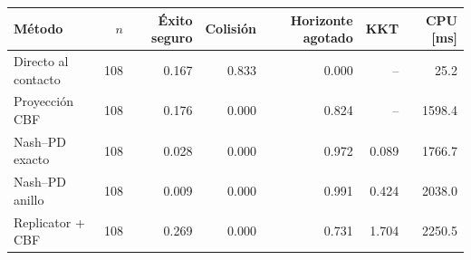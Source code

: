 \begin{tabular}{lrrrrrr}
\toprule
M\'etodo & $n$ & \'Exito seguro & Colisi\'on & Horizonte agotado & KKT & CPU [ms] \\
\midrule
Directo al contacto & 108 & 0.167 & 0.833 & 0.000 & -- & 25.2 \\
Proyecci\'on CBF & 108 & 0.176 & 0.000 & 0.824 & -- & 1598.4 \\
Nash--PD exacto & 108 & 0.028 & 0.000 & 0.972 & 0.089 & 1766.7 \\
Nash--PD anillo & 108 & 0.009 & 0.000 & 0.991 & 0.424 & 2038.0 \\
Replicator + CBF & 108 & 0.269 & 0.000 & 0.731 & 1.704 & 2250.5 \\
\bottomrule
\end{tabular}
